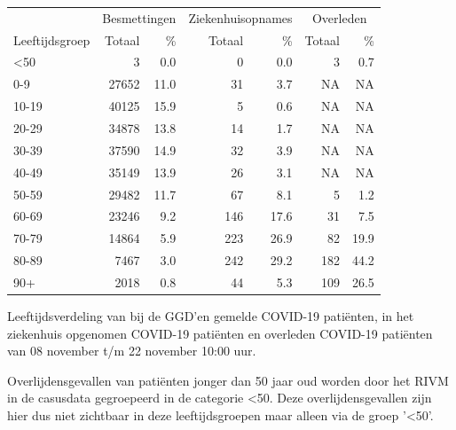 \documentclass[
  english,
  man,floatsintext]{apa6}
\begin{document}
\begin{table}
\centering\begingroup\fontsize{11}{13}\selectfont

\begin{threeparttable}
\begin{tabular}{lrrrrrr}
\toprule
\multicolumn{1}{c}{ } & \multicolumn{2}{c}{Besmettingen} & \multicolumn{2}{c}{Ziekenhuisopnames} & \multicolumn{2}{c}{Overleden} \\
\cmidrule(l{3pt}r{3pt}){2-3} \cmidrule(l{3pt}r{3pt}){4-5} \cmidrule(l{3pt}r{3pt}){6-7}
Leeftijdsgroep & Totaal & \% & Totaal & \% & Totaal & \%\\
\midrule
<50 & 3 & 0.0 & 0 & 0.0 & 3 & 0.7\\
0-9 & 27652 & 11.0 & 31 & 3.7 & NA & NA\\
10-19 & 40125 & 15.9 & 5 & 0.6 & NA & NA\\
20-29 & 34878 & 13.8 & 14 & 1.7 & NA & NA\\
30-39 & 37590 & 14.9 & 32 & 3.9 & NA & NA\\
40-49 & 35149 & 13.9 & 26 & 3.1 & NA & NA\\
50-59 & 29482 & 11.7 & 67 & 8.1 & 5 & 1.2\\
60-69 & 23246 & 9.2 & 146 & 17.6 & 31 & 7.5\\
70-79 & 14864 & 5.9 & 223 & 26.9 & 82 & 19.9\\
80-89 & 7467 & 3.0 & 242 & 29.2 & 182 & 44.2\\
90+ & 2018 & 0.8 & 44 & 5.3 & 109 & 26.5\\
\bottomrule
\end{tabular}
\begin{tablenotes}
\item[1] Leeftijdsverdeling van bij de GGD’en gemelde COVID-19 patiënten, in het ziekenhuis opgenomen COVID-19 patiënten en overleden COVID-19 patiënten van 08 november t/m 22 november 10:00 uur.
\item[2] Overlijdensgevallen van patiënten jonger dan 50 jaar oud worden door het RIVM in de casusdata gegroepeerd in de categorie <50. Deze overlijdensgevallen zijn hier dus niet zichtbaar in deze leeftijdsgroepen maar alleen via de groep '<50'.
\end{tablenotes}
\end{threeparttable}
\endgroup{}
\end{table}

\newpage
\end{document}
